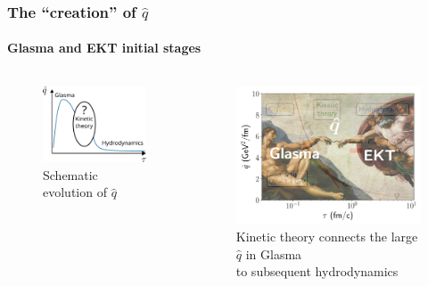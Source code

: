 \documentclass[aspectratio=169,11pt,usenames,dvipsnames]{beamer}
\begin{document}
\begin{frame}[noframenumbering]
    \frametitle{The ``creation'' of $\hat{q}$}
    \framesubtitle{Glasma and EKT initial stages}
    \vspace{-0.4cm}
    \begin{columns}[onlytextwidth,t]
        \begin{figure}[!hbt]
            \centering
            \captionsetup{justification=centering}
            \caption{Schematic evolution of $\hat{q}$}\vspace{-0.3cm}
            \includegraphics[width=0.78\columnwidth]{images/qhat_schematic_evolution.pdf}\vspace{-0.3cm}
        \end{figure}
        \begin{figure}[!hbt]
            \centering
            \captionsetup{justification=centering}
            \caption{{\color{ForestGreen}Kinetic theory} connects the large $\hat{q}$ in {\color{Dandelion}Glasma}\\ to subsequent {\color{Periwinkle}hydrodynamics}}\vspace{-0.2cm}
            \includegraphics[width=0.8\columnwidth]{images/qhat_glasma_ekt.png}

\end{figure}
\end{columns}
\end{frame}
\end{document}
